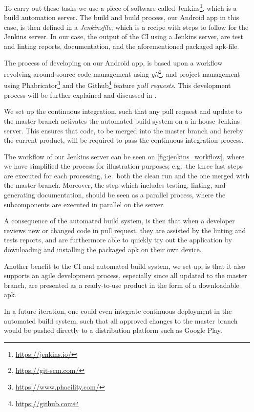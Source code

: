 To carry out these tasks we use a piece of software called Jenkins\footnote{\url{https://jenkins.io/}}, which is a build automation server.
The build and build process, our Android app in this case, is then defined in a \textit{Jenkinsfile}, which is a recipe with steps to follow for the Jenkins server.
In our case, the output of the \acl{CI} using a Jenkins server, are test and linting reports, documentation, and the aforementioned packaged apk-file.

The process of developing on our Android app, is based upon a workflow revolving around source code management using \textit{git}\footnote{\url{https://git-scm.com/}}, and project management using Phabricator\footnote{\url{https://www.phacility.com/}} and the Github\footnote{\url{https://github.com}} feature \textit{pull requests}.
This development process will be further explained and discussed in .

We set up the continuous integration, such that any pull request and update to the master branch activates the automated build system on a in-house Jenkins server.
This ensures that code, to be merged into the master branch and hereby the current product, will be required to pass the continuous integration process.

The workflow of our Jenkins server can be seen on \cref{fig:jenkins_workflow}, where we have simplified the process for illustration purposes; e.g.~the three last steps are executed for each processing, i.e.~both the clean run and the one merged with the master branch.
Moreover, the step which includes testing, linting, and generating documentation, should be seen as a parallel process, where the subcomponents are executed in parallel on the server.



A consequence of the automated build system, is then that when a developer reviews new or changed code in pull request, they are assisted by the linting and tests reports, and are furthermore able to quickly try out the application by downloading and installing the packaged apk on their own device.

\bigskip
Another benefit to the \acl{CI} and automated build system, we set up, is that it also supports an agile development process, especially since all updated to the master branch, are presented as a ready-to-use product in the form of a downloadable apk.

In a future iteration, one could even integrate continuous deployment in the automated build system, such that all approved changes to the master branch would be pushed directly to a distribution platform such as Google Play.


